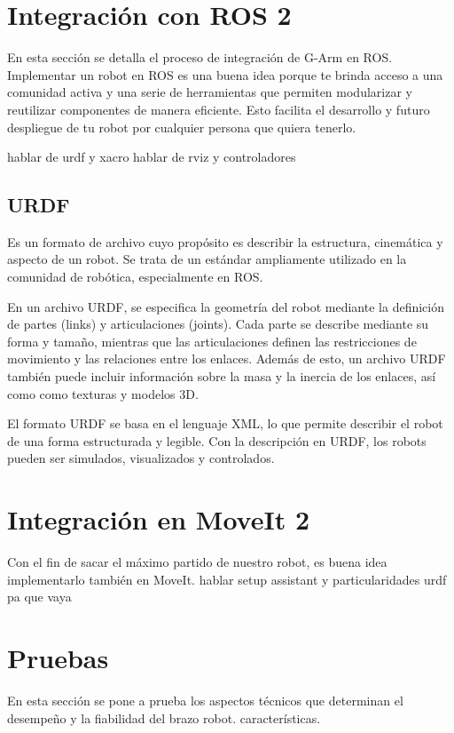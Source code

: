 \section{Integración con ROS 2}
En esta sección se detalla el proceso de integración de G-Arm en \acs{ROS}.
Implementar un robot en \acs{ROS} es una buena idea porque te brinda acceso a una comunidad activa y una serie de herramientas 
que permiten modularizar y reutilizar componentes de manera eficiente. Esto facilita el desarrollo y futuro despliegue de tu robot por 
cualquier persona que quiera tenerlo.

hablar de urdf y xacro
hablar de rviz y controladores

\subsection{\ac{URDF}}
Es un formato de archivo cuyo propósito es describir la estructura, cinemática y aspecto de un robot.  
Se trata de un estándar ampliamente utilizado en la comunidad de robótica, especialmente en \ac{ROS}.

En un archivo URDF, se especifica la geometría del robot mediante la definición de partes (links) y articulaciones (joints). 
Cada parte se describe mediante su forma y tamaño, mientras que las articulaciones definen las restricciones de movimiento y las relaciones entre los enlaces.
Además de esto, un archivo URDF también puede incluir información sobre la masa y la inercia de los enlaces, así como como texturas y modelos 3D.

El formato URDF se basa en el lenguaje \ac{XML}, lo que permite describir el robot de una forma estructurada y legible. Con la descripción 
en URDF, los robots pueden ser simulados, visualizados y controlados.

\section{Integración en MoveIt 2}
Con el fin de sacar el máximo partido de nuestro robot, es buena idea implementarlo también en MoveIt.
hablar setup assistant y particularidades urdf pa que vaya
\section{Pruebas}
En esta sección se pone a prueba los aspectos técnicos que determinan el desempeño y la fiabilidad del brazo robot. 
características.


